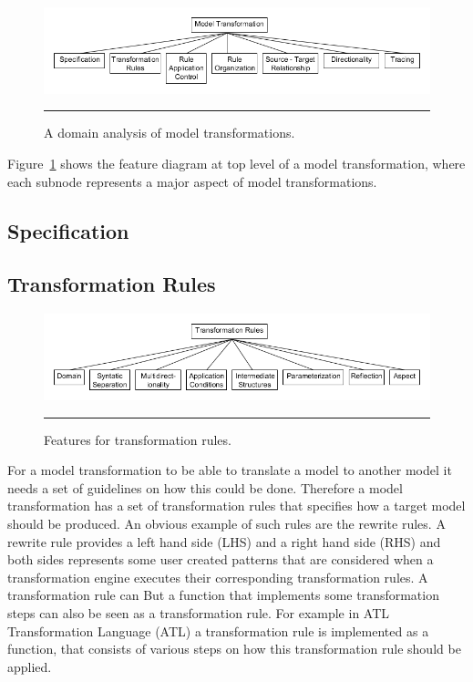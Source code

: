 \begin{figure}[H]
  \centering
    \includegraphics[scale=0.6]{./Figures/Model_Transformation_Survey.png}
    \rule{35em}{0.5pt}
  \caption[Domain Analysis of Model Transformations]
  				{A domain analysis of model transformations\cite{Czarnecki2006}.}
  \label{fig:Model_Transformation_Survey}
\end{figure}

Figure~\ref{fig:Model_Transformation_Survey} shows the feature diagram at top
level of a model transformation, where each subnode represents a major aspect
of model transformations. 

\subsection{Specification}

\subsection{Transformation Rules}

\begin{figure}[H]
  \centering
    \includegraphics[scale=0.6]{./Figures/TransformationRules.png}
    \rule{35em}{0.5pt}
  \caption[Feature diagram for transformation rules]
  {Features for transformation rules.}
  \label{fig:TransformationRules}
\end{figure}

For a model transformation to be able to translate a model to another model it
needs a set of guidelines on how this could be done. Therefore a model
transformation has a set of transformation rules that specifies how a target
model should be produced. An obvious example of such rules are the rewrite
rules. A rewrite rule provides a left hand side (LHS) and a right hand side
(RHS) and both sides represents some user created patterns that are considered
when a transformation engine executes their corresponding transformation rules.
A transformation rule can 
But a function that implements some transformation steps can also be seen as a
transformation rule. For example in ATL Transformation Language (ATL) \cite{ATL}
a transformation rule is implemented as a function, that consists of various
steps on how this transformation rule should be applied. 

